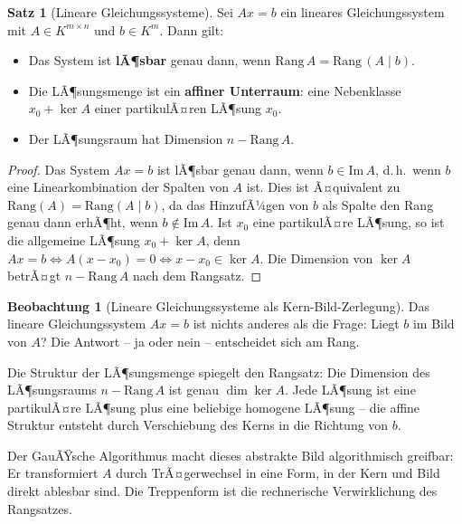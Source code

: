 ﻿\documentclass[a4paper,12pt]{report}
\theoremstyle{definition}
\newtheorem{satz}{Satz}
\newtheorem{beobachtung}{Beobachtung}
\begin{document}
\begin{satz}[Lineare Gleichungssysteme]
    Sei $Ax = b$ ein lineares Gleichungssystem mit $A \in K^{m \times n}$
    und $b \in K^m$. Dann gilt:
    \begin{itemize}
        \item[-] Das System ist \textbf{lÃ¶sbar} genau dann, wenn
              $\mathrm{Rang}\, A = \mathrm{Rang}\,(A \mid b)$.
        \item[-] Die LÃ¶sungsmenge ist ein \textbf{affiner Unterraum}: eine
              Nebenklasse $x_0 + \ker A$ einer partikulÃ¤ren LÃ¶sung $x_0$.
        \item[-] Der LÃ¶sungsraum hat Dimension $n - \mathrm{Rang}\, A$.
    \end{itemize}
\end{satz}
\begin{proof}
    Das System $Ax = b$ ist lÃ¶sbar genau dann, wenn $b \in \mathrm{Im}\, A$,
    d.\,h.\ wenn $b$ eine Linearkombination der Spalten von $A$ ist.
    Dies ist Ã¤quivalent zu $\mathrm{Rang}(A) = \mathrm{Rang}(A \mid b)$,
    da das HinzufÃ¼gen von $b$ als Spalte den Rang genau dann erhÃ¶ht,
    wenn $b \notin \mathrm{Im}\, A$.
    Ist $x_0$ eine partikulÃ¤re LÃ¶sung, so ist die allgemeine LÃ¶sung
    $x_0 + \ker A$, denn $Ax = b \Leftrightarrow A(x - x_0) = 0
    \Leftrightarrow x - x_0 \in \ker A$.
    Die Dimension von $\ker A$ betrÃ¤gt $n - \mathrm{Rang}\, A$ nach dem Rangsatz.
\end{proof}


\begin{beobachtung}[Lineare Gleichungssysteme als Kern-Bild-Zerlegung]
    Das lineare Gleichungssystem $Ax = b$ ist nichts anderes als die
    Frage: Liegt $b$ im Bild von $A$? Die Antwort -- ja oder nein --
    entscheidet sich am Rang.

    Die Struktur der LÃ¶sungsmenge spiegelt den Rangsatz: Die
    Dimension des LÃ¶sungsraums $n - \mathrm{Rang}\, A$ ist genau
    $\dim \ker A$. Jede LÃ¶sung ist eine partikulÃ¤re LÃ¶sung plus
    eine beliebige homogene LÃ¶sung -- die affine Struktur entsteht
    durch Verschiebung des Kerns in die Richtung von $b$.

    Der GauÃŸsche Algorithmus macht dieses abstrakte Bild algorithmisch
    greifbar: Er transformiert $A$ durch TrÃ¤gerwechsel in eine Form, in der
    Kern und Bild direkt ablesbar sind. Die Treppenform ist die
    rechnerische Verwirklichung des Rangsatzes.
\end{beobachtung}
\end{document}
